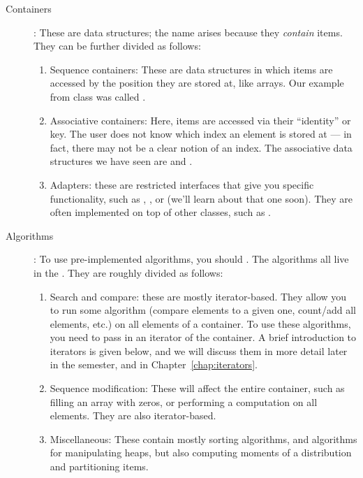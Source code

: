\begin{description}
\item[Containers]: These are data structures; the name arises because
  they \emph{contain} items. They can be further divided as follows:
\begin{enumerate}
\item Sequence containers: These are data structures in which items
  are accessed by the position they are stored at, like arrays.
  Our example from class was called .
\item Associative containers: Here, items are accessed via their
  ``identity'' or key. The user does not know which index an element
  is stored at --- in fact, there may not be a clear notion of an index.
  The associative data structures we have seen are  and
  .
\item Adapters: these are restricted interfaces that give you specific
  functionality, such as , , or  (we'll learn about that one soon). 
  They are often implemented on top of other classes, such 
    as .
\end{enumerate}
		
\item[Algorithms]: To use pre-implemented algorithms, you should
. The algorithms all live in the 
. They are roughly divided as follows:
\begin{enumerate}
\item Search and compare: these are mostly iterator-based. They allow
  you to run some algorithm (compare elements to a given one, count/add all
  elements, etc.) on all elements of a container.
  To use these algorithms, you need to pass in an iterator of the
  container. A brief introduction to iterators is given below, and we
  will discuss them in more detail later in the semester, and in
  Chapter~\ref{chap:iterators}. 
\item Sequence modification: These will affect the entire container,
  such as filling an array with zeros, or performing a computation on
  all elements. They are also iterator-based. 
\item Miscellaneous: These contain mostly sorting algorithms, and
  algorithms for manipulating heaps, but also computing moments of a
  distribution and partitioning items. 
\end{enumerate}
\end{description}


